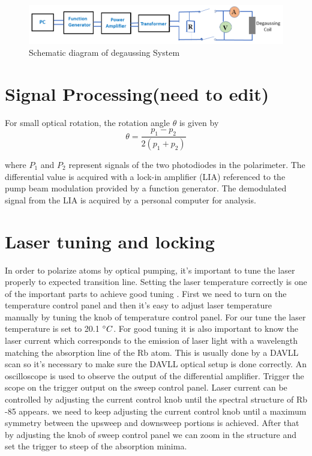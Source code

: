 \documentclass[12pt]{report}
\begin{document}
\begin{figure}[h]
\centering
\includegraphics[width=1.0\linewidth]{figures/degaussing_system}
\caption{Schematic diagram of degaussing System}
\end{figure}

\section{Signal Processing(need to edit)}
For small optical rotation, the rotation angle $\theta$ is given by 
\begin{equation}
\theta=\frac{p_1-p_2}{2(p_1+p_2)}
\end{equation}
       
where $P_1$ and $P_2$ represent signals of the two photodiodes in the polarimeter. The differential value is acquired with a lock-in amplifier (LIA) referenced to the pump beam modulation provided by a function generator. The demodulated signal from the LIA is acquired by a personal computer for analysis. 
\section{Laser tuning and locking}
In order to polarize atoms by optical pumping, it's important to tune the laser properly to expected transition line.
Setting the laser temperature correctly is one of the important parts to achieve good tuning . First we need to turn on the temperature control panel and then it’s easy to adjust laser temperature manually by tuning the knob of temperature control panel. For our tune the laser temperature is set to 20.1 $\degree C$. For good tuning it is also important to know the laser current which corresponds to the emission of laser light with a wavelength matching the absorption line of the Rb atom. This is usually done by a DAVLL scan so it's necessary to make sure the DAVLL optical setup is done correctly. An oscilloscope is used to observe the output of the differential amplifier. Trigger the scope on the trigger output on the sweep control panel.
Laser current can be controlled by adjusting the current control knob until the spectral structure of Rb -85 appears. we need to keep adjusting the current control knob until a maximum symmetry between the upsweep and downsweep portions is achieved. After that by adjusting the knob of sweep control panel we can zoom in the structure and set the trigger to steep of the absorption minima. 
\end{document}
